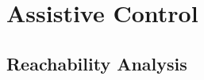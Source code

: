 \documentclass[letterpaper, 10 pt, conference]{ieeeconf}  %
\newcommand\NB[1]{$\spadesuit$\footnote{NB: #1}}
\begin{document}


\section{Assistive Control} \label{sec:adapt}


\subsection{Reachability Analysis}
\end{document}
